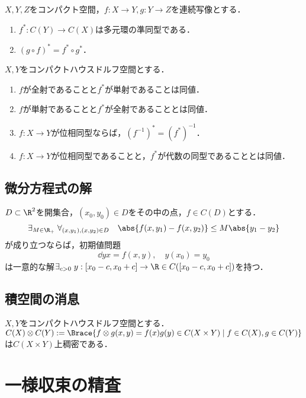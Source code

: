 \documentclass[uplatex,dvipdfmx]{jsreport}
\begin{document}
\begin{theorem}
    $X,Y,Z$をコンパクト空間，$f:X\to Y,g:Y\to Z$を連続写像とする．
    \begin{enumerate}
        \item $f^*:C(Y)\to C(X)$は多元環の準同型である．
        \item $(g\circ f)^*=f^*\circ g^*$．
    \end{enumerate}
\end{theorem}

\begin{theorem}
    $X,Y$をコンパクトハウスドルフ空間とする．
    \begin{enumerate}
        \item $f$が全射であることと$f^*$が単射であることは同値．
        \item $f$が単射であることと$f^*$が全射であることとは同値．
        \item $f:X\to Y$が位相同型ならば，$(f^{-1})^*=(f^*)^{-1}$．
        \item $f:X\to Y$が位相同型であることと，$f^*$が代数の同型であることとは同値．
    \end{enumerate}
\end{theorem}

\subsection{微分方程式の解}

\begin{theorem}
    $D\subset\R^2$を開集合，$(x_0,y_0)\in D$をその中の点，$f\in C(D)$とする．
    \[\exists_{M\in\R_+}\;\forall_{(x,y_1),(x,y_2)\in D}\quad\abs{f(x,y_1)-f(x,y_2)}\le M\abs{y_1-y_2}\]
    が成り立つならば，初期値問題
    \[\dd{y}{x}=f(x,y),\quad y(x_0)=y_0\]
    は一意的な解$\exists_{c>0}\;y:[x_0-c,x_0+c]\to\R\in C([x_0-c,x_0+c])$を持つ．
\end{theorem}

\subsection{積空間の消息}

\begin{theorem}
    $X,Y$をコンパクトハウスドルフ空間とする．$C(X)\otimes C(Y):=\Brace{f\otimes g(x,y)=f(x)g(y)\in C(X\times Y)\mid f\in C(X),g\in C(Y)}$は$C(X\times Y)$上稠密である．
\end{theorem}

\section{一様収束の精査}
\end{document}
